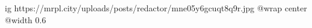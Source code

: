  
 
 
 
 

\ifcmt
  ig https://mrpl.city/uploads/posts/redactor/mne05y6gcuqt8q9r.jpg
  @wrap center
  @width 0.6
\fi
